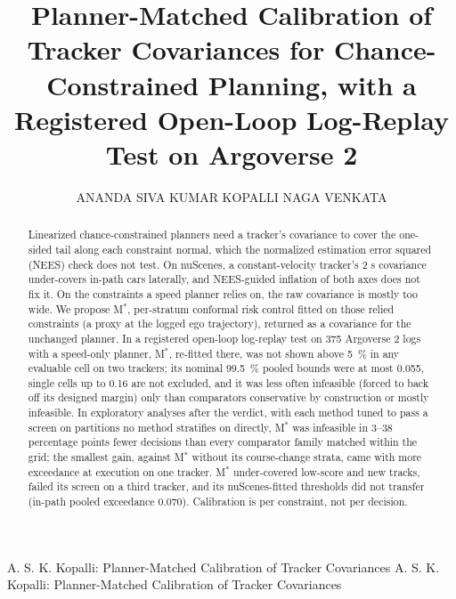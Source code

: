 \documentclass{ieeeaccess}
\begin{document}

\title{Planner-Matched Calibration of Tracker Covariances for Chance-Constrained Planning, with a Registered Open-Loop Log-Replay Test on Argoverse 2}
\author{\uppercase{Ananda Siva Kumar Kopalli Naga Venkata}}
\address[1]{Independent Researcher (e-mail: anand.knvasks@gmail.com; ORCID: 0009-0002-5241-9922)}

\markboth
{A. S. K. Kopalli: Planner-Matched Calibration of Tracker Covariances}
{A. S. K. Kopalli: Planner-Matched Calibration of Tracker Covariances}


\begin{abstract}
Linearized chance-constrained planners need a tracker's covariance to cover the one-sided tail along each constraint normal, which the normalized estimation error squared (NEES) check does not test. On nuScenes, a constant-velocity tracker's 2 s covariance under-covers in-path cars laterally, and NEES-guided inflation of both axes does not fix it. On the constraints a speed planner relies on, the raw covariance is mostly too wide. We propose M$^{*}$, per-stratum conformal risk control fitted on those relied constraints (a proxy at the logged ego trajectory), returned as a covariance for the unchanged planner. In a registered open-loop log-replay test on 375 Argoverse 2 logs with a speed-only planner, M$^{*}$, re-fitted there, was not shown above 5~\% in any evaluable cell on two trackers; its nominal 99.5~\% pooled bounds were at most 0.055, single cells up to 0.16 are not excluded, and it was less often infeasible (forced to back off its designed margin) only than comparators conservative by construction or mostly infeasible. In exploratory analyses after the verdict, with each method tuned to pass a screen on partitions no method stratifies on directly, M$^{*}$ was infeasible in 3--38 percentage points fewer decisions than every comparator family matched within the grid; the smallest gain, against M$^{*}$ without its course-change strata, came with more exceedance at execution on one tracker. M$^{*}$ under-covered low-score and new tracks, failed its screen on a third tracker, and its nuScenes-fitted thresholds did not transfer (in-path pooled exceedance 0.070). Calibration is per constraint, not per decision.
\end{abstract}
\end{document}
